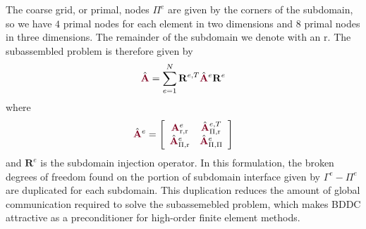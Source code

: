 The coarse grid, or primal, nodes $\Pi^e$ are given by the corners of the subdomain, so we have $4$ primal nodes for each element in two dimensions and $8$ primal nodes in three dimensions.
The remainder of the subdomain we denote with an $\text{r}$.
The subassembled problem is therefore given by
\begin{equation}
\hat{\color{burgundy}\mathbf{A}} = \sum_{e = 1}^N \mathbf{R}^{e, T} \hat{\color{burgundy}\mathbf{A}}^e \mathbf{R}^e
\label{eq:subassembled}
\end{equation}
where
\begin{equation}
\hat{\color{burgundy}\mathbf{A}}^e =
\left[ \begin{array}{c c}
{\color{burgundy}\mathbf{A}}_{\text{r}, \text{r}}^e  &  \hat{\color{burgundy}\mathbf{A}}_{\Pi, \text{r}}^{e, T}  \\
\hat{\color{burgundy}\mathbf{A}}_{\Pi, \text{r}}^e   &  \hat{\color{burgundy}\mathbf{A}}_{\Pi, \Pi}^e            \\
\end{array} \right]
\end{equation}
and $\mathbf{R}^e$ is the subdomain injection operator. 
In this formulation, the broken degrees of freedom found on the portion of subdomain interface given by $\Gamma^e - \Pi^e$ are duplicated for each subdomain.
This duplication reduces the amount of global communication required to solve the subassemebled problem, which makes BDDC attractive as a preconditioner for high-order finite element methods.

